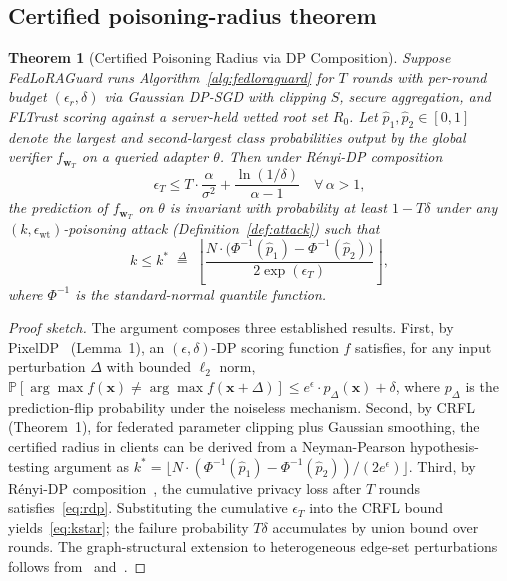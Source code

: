 \documentclass[12pt,a4paper]{article}
\newtheorem{theorem}{Theorem}
\theoremstyle{definition}
\theoremstyle{remark}
\newcommand{\modelname}{FedLoRAGuard}
\providecommand{\Prob}{}\renewcommand{\Prob}{\mathbb{P}}
\begin{document}
\subsection{Certified poisoning-radius theorem}

\begin{theorem}[Certified Poisoning Radius via DP Composition]
\label{thm:certified}
Suppose \modelname{} runs Algorithm~\ref{alg:fedloraguard} for $T$ rounds with per-round budget $(\epsilon_r, \delta)$ via Gaussian DP-SGD with clipping $S$, secure aggregation, and FLTrust scoring against a server-held vetted root set $R_0$. Let $\hat{p}_1, \hat{p}_2 \in [0, 1]$ denote the largest and second-largest class probabilities output by the global verifier $f_{\mathbf{w}_T}$ on a queried adapter $\theta$. Then under R\'enyi-DP composition
\begin{equation}
    \epsilon_T \leq T \cdot \frac{\alpha}{\sigma^2} + \frac{\ln(1/\delta)}{\alpha - 1} \quad \forall\, \alpha > 1,
\label{eq:rdp}
\end{equation}
the prediction of $f_{\mathbf{w}_T}$ on $\theta$ is invariant with probability at least $1 - T\delta$ under any $(k, \epsilon_{\mathrm{wt}})$-poisoning attack (Definition~\ref{def:attack}) such that
\begin{equation}
    k \leq k^* \;\stackrel{\Delta}{=}\; \left\lfloor \frac{N \cdot \bigl(\Phi^{-1}(\hat{p}_1) - \Phi^{-1}(\hat{p}_2)\bigr)}{2 \exp(\epsilon_T)} \right\rfloor,
\label{eq:kstar}
\end{equation}
where $\Phi^{-1}$ is the standard-normal quantile function.
\end{theorem}

\begin{proof}[Proof sketch]
The argument composes three established results. First, by PixelDP~\cite{lecuyer2019certified} (Lemma~1), an $(\epsilon, \delta)$-DP scoring function $f$ satisfies, for any input perturbation $\Delta$ with bounded $\ell_2$ norm, $\Prob[\arg\max f(\mathbf{x}) \neq \arg\max f(\mathbf{x} + \Delta)] \leq e^{\epsilon} \cdot p_{\Delta}(\mathbf{x}) + \delta$, where $p_{\Delta}$ is the prediction-flip probability under the noiseless mechanism. Second, by CRFL~\cite{xie2021crfl} (Theorem~1), for federated parameter clipping plus Gaussian smoothing, the certified radius in clients can be derived from a Neyman-Pearson hypothesis-testing argument as $k^* = \lfloor N \cdot (\Phi^{-1}(\hat{p}_1) - \Phi^{-1}(\hat{p}_2)) / (2 e^{\epsilon}) \rfloor$. Third, by R\'enyi-DP composition~\cite{mironov2017renyi}, the cumulative privacy loss after $T$ rounds satisfies~\eqref{eq:rdp}. Substituting the cumulative $\epsilon_T$ into the CRFL bound yields~\eqref{eq:kstar}; the failure probability $T\delta$ accumulates by union bound over rounds. The graph-structural extension to heterogeneous edge-set perturbations follows from~\cite{wang2021certgnn} and~\cite{scholten2022randomized}.
\end{proof}
\end{document}
